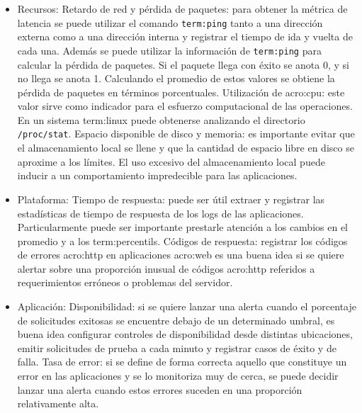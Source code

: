 \begin{itemize}
  \item Recursos:
    \subitem Retardo de red y pérdida de paquetes: para obtener la métrica de
    latencia se puede utilizar el comando \texttt{\gls{term:ping}} tanto a una
    dirección externa como a una dirección interna y registrar el tiempo de ida
    y vuelta de cada una. Además se puede utilizar la información de
    \texttt{\gls{term:ping}} para calcular la pérdida de paquetes.  Si el
    paquete llega con éxito se anota 0, y si no llega se anota 1. Calculando el
    promedio de estos valores se obtiene la pérdida de paquetes en términos
    porcentuales.
    \subitem Utilización de \gls{acro:cpu}: este valor sirve como indicador
    para el esfuerzo computacional de las operaciones. En un sistema
    \gls{term:linux} puede obtenerse analizando el directorio
    \texttt{/proc/stat}.
    \subitem Espacio disponible de disco y memoria: es importante evitar que el
    almacenamiento local se llene y que la cantidad de espacio libre en disco
    se aproxime a los límites. El uso excesivo del almacenamiento local puede
    inducir a un comportamiento impredecible para las aplicaciones.

  \item Plataforma:
    \subitem Tiempo de respuesta: puede ser útil extraer y registrar las
    estadísticas de tiempo de respuesta de los logs de las aplicaciones.
    Particularmente puede ser importante prestarle atención a los cambios en el
    promedio y a los \glspl{term:percentil}.
    \subitem Códigos de respuesta: registrar los códigos de errores
    \gls{acro:http} en aplicaciones \gls{acro:web} es una buena idea si se
    quiere alertar sobre una proporción inusual de códigos \gls{acro:http}
    referidos a requerimientos erróneos o problemas del servidor.

  \item Aplicación:
    \subitem Disponibilidad: si se quiere lanzar una alerta cuando el
    porcentaje de solicitudes exitosas se encuentre debajo de un determinado
    umbral, es buena idea configurar controles de disponibilidad desde
    distintas ubicaciones, emitir solicitudes de prueba a cada minuto y
    registrar casos de éxito y de falla.
    \subitem Tasa de error: si se define de forma correcta aquello que
    constituye un error en las aplicaciones y se lo monitoriza muy de cerca, se
    puede decidir lanzar una alerta cuando estos errores suceden en una
    proporción relativamente alta.

\end{itemize}

